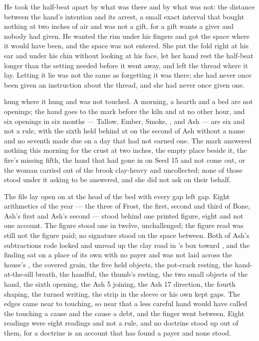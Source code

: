 He took the half-beat apart by what was there and by what was not: the distance between the hand's intention and its arrest, a small exact interval that bought nothing at two inches of air and was not a gift, for a gift wants a giver and nobody had given. He wanted the rim under his fingers and got the space where it would have been, and the space was not entered. She put the fold right at his ear and under his chin without looking at his face, let her hand rest the half-beat longer than the setting needed before it went away, and left the thread where it lay. Letting it lie was not the same as forgetting it was there; she had never once been given an instruction about the thread, and she had never once given one.

\scenebreak

 hung where it hung and was not touched. A morning, a hearth and a bed are not openings; the hand goes to the mark before the kiln and at no other hour, and six openings in six months --- Tallow, Ember, Smoke, ,  and Ash --- are six and not a rule, with the sixth held behind at  on the second of Ash without a name and no seventh made due on a day that had not earned one. The mark answered nothing this morning for the crust at two inches, the empty place beside it, the fire's missing fifth, the hand that had gone in on Seed 15 and not come out, or the woman carried out of the brook clay-heavy and uncollected; none of those stood under it asking to be answered, and she did not ask on their behalf.

The file lay open on  at the head of the bed with every gap left gap. Eight arithmetics of the year --- the three of Frost, the first, second and third of Bone, Ash's first and Ash's second --- stood behind one printed figure, eight and not one account. The figure stood one in twelve, unchallenged; the figure read was still not the figure paid; no signature stood on the space between. Both of Ash's subtractions rode locked and unread up the clay road in 's box toward , and the finding sat on a place of its own with no payer and was not laid across the house's , the covered grain, the five held objects, the pot-crack resting, the hand-at-the-sill breath, the handful, the thumb's resting, the two small objects of the hand, the sixth opening, the Ash 5 joining, the Ash 17 direction, the fourth shaping, the turned writing, the strip in the sleeve or his own kept gaps. The edges came near to touching, so near that a less careful hand would have called the touching a cause and the cause a debt, and the finger went between. Eight readings were eight readings and not a rule, and no doctrine stood up out of them, for a doctrine is an account that has found a payer and none stood.

